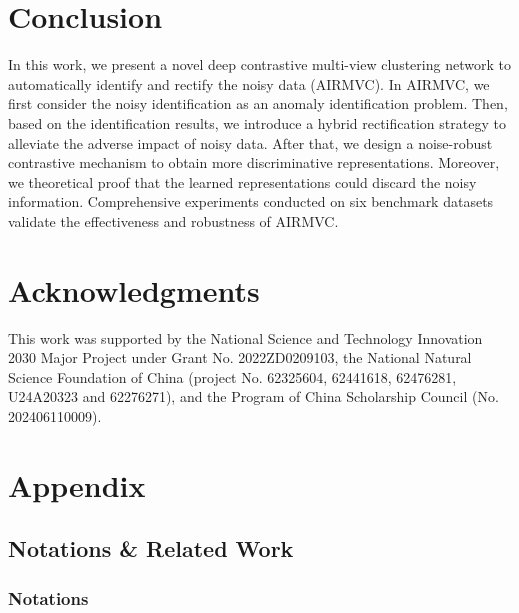\documentclass{article}
\theoremstyle{plain}
\theoremstyle{definition}
\theoremstyle{remark}
\begin{document}
\section{Conclusion}

In this work, we present a novel deep contrastive multi-view clustering network to automatically identify and rectify the noisy data (AIRMVC). In AIRMVC, we first consider the noisy identification as an anomaly identification problem. Then, based on the identification results, we introduce a hybrid rectification strategy to alleviate the adverse impact of noisy data. After that, we design a noise-robust contrastive mechanism to obtain more discriminative representations. Moreover, we theoretical proof that the learned representations could discard the noisy information. Comprehensive experiments conducted on six benchmark datasets validate the effectiveness and robustness of AIRMVC.

 

\newpage

\section*{Acknowledgments}
This work was supported by the National Science and Technology Innovation 2030 Major Project under Grant No. 2022ZD0209103, the National Natural Science Foundation of China (project No. 62325604, 62441618, 62476281, U24A20323 and 62276271), and the Program of China Scholarship Council (No. 202406110009). 





\newpage
\appendix
\onecolumn
\section{Appendix}

\subsection{Notations \& Related Work}
\subsubsection{Notations}
\end{document}
